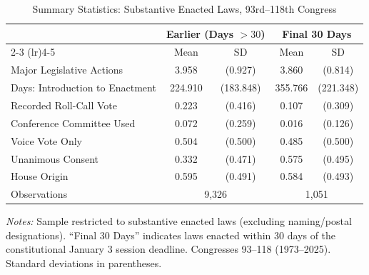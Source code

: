 \begin{table}[t]
\centering
\caption{Summary Statistics: Substantive Enacted Laws, 93rd--118th Congress}
\label{tab:summary}
\small
\begin{tabular}{lcccc}
\toprule
 & \multicolumn{2}{c}{Earlier (Days $> 30$)} & \multicolumn{2}{c}{Final 30 Days} \\
\cmidrule(lr){2-3} \cmidrule(lr){4-5}
 & Mean & SD & Mean & SD \\
\midrule
Major Legislative Actions & 3.958 & (0.927) & 3.860 & (0.814) \\
Days: Introduction to Enactment & 224.910 & (183.848) & 355.766 & (221.348) \\
Recorded Roll-Call Vote & 0.223 & (0.416) & 0.107 & (0.309) \\
Conference Committee Used & 0.072 & (0.259) & 0.016 & (0.126) \\
Voice Vote Only & 0.504 & (0.500) & 0.485 & (0.500) \\
Unanimous Consent & 0.332 & (0.471) & 0.575 & (0.495) \\
House Origin & 0.595 & (0.491) & 0.584 & (0.493) \\
\midrule
Observations & \multicolumn{2}{c}{9,326} & \multicolumn{2}{c}{1,051} \\
\bottomrule
\end{tabular}
\begin{tablenotes}
\item \textit{Notes:} Sample restricted to substantive enacted laws (excluding naming/postal designations). ``Final 30 Days'' indicates laws enacted within 30 days of the constitutional January 3 session deadline. Congresses 93--118 (1973--2025). Standard deviations in parentheses.
\end{tablenotes}
\end{table}
